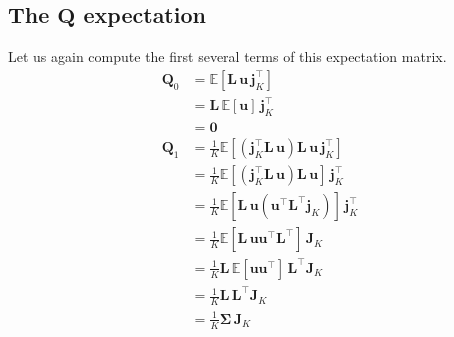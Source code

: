 \documentclass[modern]{aastex62}
\begin{document}
    \subsection{The $\mathbf{Q}$ expectation}
    Let us again compute the first several terms of this expectation matrix.
    \begin{align}
        \mathbf{Q}_0 & = \mathbb{E}\left[ \mathbf{L} \, \mathbf{u} \, \mathbf{j}_K^\top \right]
        \nonumber                                                                                                                                                  \\
                     & = \mathbf{L} \, \mathbb{E}\left[  \mathbf{u} \right] \, \mathbf{j}_K^\top
        \nonumber                                                                                                                                                  \\
                     & = \mathbf{0}
        \\[1em]
        \mathbf{Q}_1 & = \frac{1}{K}\mathbb{E}\left[ \left(\mathbf{j}_K^\top \mathbf{L} \, \mathbf{u}\right) \mathbf{L} \, \mathbf{u} \, \mathbf{j}_K^\top \right]
        \nonumber                                                                                                                                                  \\
                     & = \frac{1}{K}\mathbb{E}\left[ \left(\mathbf{j}_K^\top \mathbf{L} \, \mathbf{u}\right) \mathbf{L} \, \mathbf{u} \right] \, \mathbf{j}_K^\top
        \nonumber                                                                                                                                                  \\
                     & = \frac{1}{K}\mathbb{E}\left[ \mathbf{L} \, \mathbf{u} (\mathbf{u}^\top \mathbf{L}^\top \mathbf{j}_K) \right] \, \mathbf{j}_K^\top
        \nonumber                                                                                                                                                  \\
                     & = \frac{1}{K}\mathbb{E}\left[ \mathbf{L} \, \mathbf{u} \mathbf{u}^\top \mathbf{L}^\top  \right] \, \mathbf{J}_K
        \nonumber                                                                                                                                                  \\
                     & = \frac{1}{K}\mathbf{L} \, \mathbb{E}\left[  \mathbf{u} \mathbf{u}^\top   \right]  \, \mathbf{L}^\top \mathbf{J}_K
        \nonumber                                                                                                                                                  \\
                     & = \frac{1}{K}\mathbf{L} \, \mathbf{L}^\top \mathbf{J}_K
        \nonumber                                                                                                                                                  \\
                     & = \frac{1}{K}\pmb{\Sigma} \, \mathbf{J}_K
    \end{align}
\end{document}
